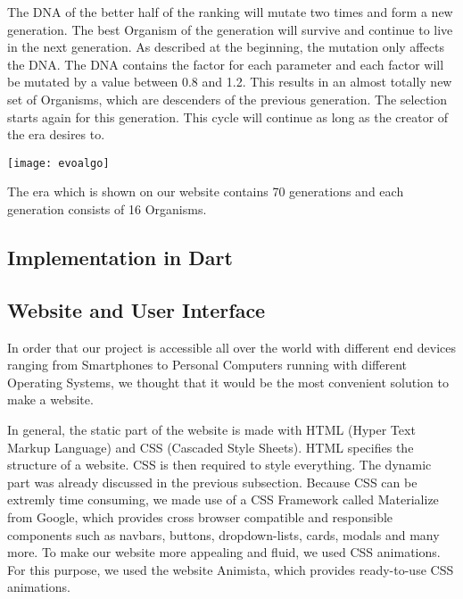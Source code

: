 The DNA of the better half of the ranking will mutate two times and form a new generation. The best Organism of the generation will survive and continue to live in the next generation.
As described at the beginning, the mutation only affects the DNA. The DNA contains the factor for each parameter and each factor will be mutated by a value between 0.8 and 1.2. This results in an almost totally new set of Organisms, which are descenders of the previous generation. The selection starts again for this generation.
This cycle will continue as long as the creator of the era desires to. \\

\begin{fixedpic}
	\centering
	\texttt{[image: evoalgo]}
\end{fixedpic}


The era which is shown on our website contains 70 generations and each generation consists of 16 Organisms.



\subsection{Implementation in Dart}


\subsection{Website and User Interface}
In order that our project is accessible all over the world with different end devices ranging from Smartphones to Personal Computers running with different Operating Systems, we thought that it would be the most convenient solution to make a website. 

In general, the static part of the website is made with HTML (Hyper Text Markup Language) and CSS (Cascaded Style Sheets). HTML specifies the structure of a website.  CSS is then required to style everything. The dynamic part was already discussed in the previous subsection. 
Because CSS can be extremly time consuming, we made use of a CSS Framework called Materialize from Google, which provides cross browser compatible and responsible components such as navbars, buttons, dropdown-lists, cards, modals and many more. To make our website more appealing and fluid, we used CSS animations. For this purpose, we used the website Animista, which provides ready-to-use CSS animations.

